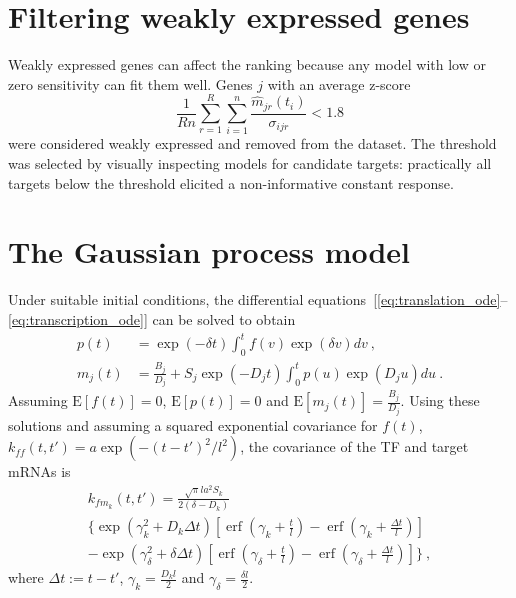 \documentclass{pnastwo}
\newcommand{\erf}{\operatorname{erf}}
\begin{document}
\begin{article}
\begin{materials}
  \section{Filtering weakly expressed genes}
  Weakly expressed genes can affect the ranking because any model
  with low or zero sensitivity can fit them
  well. Genes $j$ with an average z-score 
  $$ \frac{1}{Rn} \sum_{r=1}^R \sum_{i=1}^n \frac{\hat{m}_{jr}(t_i)}{\sigma_{ijr}} < 1.8 $$
  were considered weakly expressed and removed from the dataset.  The threshold
  was selected by visually inspecting models for candidate targets:
  practically all targets below the threshold elicited a
  non-informative constant response. %
  
  \section{The Gaussian process model}
  Under suitable initial conditions, the differential
  equations~[\ref{eq:translation_ode}--\ref{eq:transcription_ode}]
  can be solved to obtain
  \begin{align}
    \label{eq:gpsim_f_ode_sol}
    p(t) &= \exp(-\delta t) \int_0^t f(v) \exp(\delta v) dv\ , \\
    m_j(t) &= \frac{B_j}{D_j} + S_j \exp(-D_j t) \int_0^t p(u)
    \exp(D_j u) du\ .
    \label{eq:gpsim_f_x_sol}
  \end{align}
  Assuming $\mathrm{E}[f(t)]=0$, $\mathrm{E}[p(t)]=0$ and
  $\mathrm{E}[m_j(t)]=\frac{B_j}{D_j}$.
  Using these solutions and assuming a squared exponential covariance
  for $f(t)$, $k_{ff}(t, t') = a \exp( -(t-t')^2/l^2)$, the covariance
  of the TF and target mRNAs is
  \begin{multline*}
    k_{f m_k}(t, t')
    = \frac{\sqrt{\pi} l a^2 S_k}{2(\delta - D_k)} \\
    \bigg\{
    \exp\left(\gamma_k^2 + D_k \Delta t \right)
    \left[\erf\left(\gamma_k + \frac{t}{l}\right) 
      - \erf\left(\gamma_k + \frac{\Delta t}{l}\right)\right] \\
    -
    \exp\left(\gamma_\delta^2 + \delta \Delta t\right)
    \left[\erf\left(\gamma_\delta + \frac{t}{l}\right) 
      - \erf\left(\gamma_\delta + \frac{\Delta t}{l}\right)\right]
    \bigg\}\ ,
  \end{multline*}
  where $\Delta t := t - t'$, $\gamma_k = \frac{D_k l}{2}$
  and $\gamma_\delta = \frac{\delta l}{2}$.


\end{materials}
\end{article}
\end{document}
